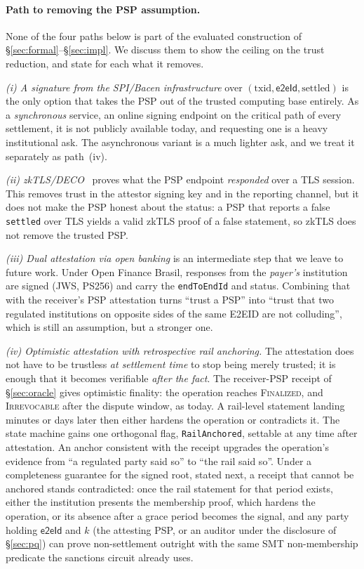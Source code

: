 \documentclass[11pt]{article}
\newcommand{\eeid}{\ensuremath{\mathsf{e2eId}}}
\newcommand{\code}[1]{\texttt{#1}}
\begin{document}
\paragraph{Path to removing the PSP assumption.}
None of the four paths below is part of the evaluated construction of
\S\ref{sec:formal}--\S\ref{sec:impl}. We discuss them to show the ceiling on
the trust reduction, and state for each what it removes.

\emph{(i) A signature from the SPI/Bacen infrastructure} over $(\text{txid},
\eeid,\text{settled})$ is the only option that takes the PSP out of the trusted
computing base entirely. As a \emph{synchronous} service, an online signing
endpoint on the critical path of every settlement, it is not publicly available
today, and requesting one is a heavy institutional ask. The asynchronous
variant is a much lighter ask, and we treat it separately as path~(iv).

\emph{(ii) zkTLS/DECO}~\cite{deco} proves what the PSP endpoint
\emph{responded} over a TLS session. This removes trust in the attestor signing
key and in the reporting channel, but it does not make the PSP honest about the
status: a PSP that reports a false \code{settled} over TLS yields a valid zkTLS
proof of a false statement, so zkTLS does not remove the trusted PSP.

\emph{(iii) Dual attestation via open banking} is an intermediate step that we
leave to future work. Under Open Finance Brasil, responses from the
\emph{payer's} institution are signed (JWS, PS256) and carry the
\code{endToEndId} and status. Combining that with the receiver's PSP
attestation turns ``trust a PSP'' into ``trust that two regulated institutions
on opposite sides of the same E2EID are not colluding'', which is still an
assumption, but a stronger one.

\emph{(iv) Optimistic attestation with retrospective rail anchoring.} The
attestation does not have to be trustless \emph{at settlement time} to stop
being merely trusted; it is enough that it becomes verifiable \emph{after the
fact}. The receiver-PSP receipt of \S\ref{sec:oracle} gives optimistic finality:
the operation reaches \textsc{Finalized}, and \textsc{Irrevocable} after the
dispute window, as today. A rail-level statement landing minutes or days later
then either hardens the operation or contradicts it. The state machine gains one
orthogonal flag, \code{RailAnchored}, settable at any time after attestation.
An anchor consistent with the receipt upgrades the operation's evidence from ``a
regulated party said so'' to ``the rail said so''. Under a completeness
guarantee for the signed root, stated next, a receipt that cannot be anchored
stands contradicted: once the rail statement for that period exists, either the
institution presents the membership proof, which hardens the operation, or its
absence after a grace period becomes the signal, and any party holding \eeid{}
and $k$ (the attesting PSP, or an auditor under the disclosure of
\S\ref{sec:pq}) can prove non-settlement outright with the same SMT
non-membership predicate the sanctions circuit already uses.
\end{document}
